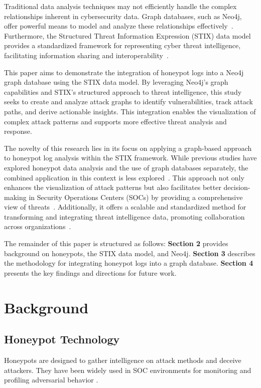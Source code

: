 \documentclass[conference]{IEEEtran}
\begin{document}
Traditional data analysis techniques may not efficiently handle the complex relationships inherent in cybersecurity data. Graph databases, such as Neo4j, offer powerful means to model and analyze these relationships effectively~\cite{robinson2015graph}. Furthermore, the Structured Threat Information Expression (STIX) data model provides a standardized framework for representing cyber threat intelligence, facilitating information sharing and interoperability~\cite{oasis2023stix}.

This paper aims to demonstrate the integration of honeypot logs into a Neo4j graph database using the STIX data model. By leveraging Neo4j's graph capabilities and STIX's structured approach to threat intelligence, this study seeks to create and analyze attack graphs to identify vulnerabilities, track attack paths, and derive actionable insights. This integration enables the visualization of complex attack patterns and supports more effective threat analysis and response.

The novelty of this research lies in its focus on applying a graph-based approach to honeypot log analysis within the STIX framework. While previous studies have explored honeypot data analysis and the use of graph databases separately, the combined application in this context is less explored~\cite{sharma2018utilizing}. This approach not only enhances the visualization of attack patterns but also facilitates better decision-making in Security Operations Centers (SOCs) by providing a comprehensive view of threats~\cite{ring2019survey}. Additionally, it offers a scalable and standardized method for transforming and integrating threat intelligence data, promoting collaboration across organizations~\cite{barnum2012standardizing}.

The remainder of this paper is structured as follows: \textbf{Section 2} provides background on honeypots, the STIX data model, and Neo4j. \textbf{Section 3} describes the methodology for integrating honeypot logs into a graph database. \textbf{Section 4} presents the key findings and directions for future work.




\section{Background}
\subsection{Honeypot Technology}
Honeypots are designed to gather intelligence on attack methods and deceive attackers. They have been widely used in SOC environments for monitoring and profiling adversarial behavior \cite{honeypotsurvey}.
\end{document}
